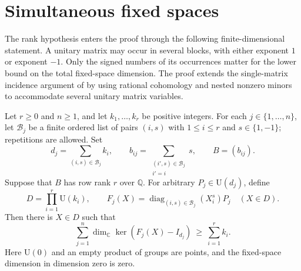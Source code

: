 \section{Simultaneous fixed spaces}\label{sec:fixed}

The rank hypothesis enters the proof through the following finite-dimensional
statement.  A unitary matrix may occur in several blocks, with either exponent
$1$ or exponent $-1$.  Only the signed numbers of its occurrences matter for
the lower bound on the total fixed-space dimension.
The proof extends the single-matrix incidence argument of
\cite[Lemma~3.1]{OpenAIKervaire2026} by using rational cohomology and
nested nonzero minors to accommodate several unitary matrix variables.

\begin{theorem}\label{thm:fixed-space}
Let $r\geq 0$ and $n\geq 1$, and let $k_1,\ldots,k_r$ be positive integers.
For each $j\in\{1,\ldots,n\}$, let $\mathcal B_j$ be a finite ordered list
of pairs $(i,s)$ with $1\leq i\leq r$ and $s\in\{1,-1\}$; repetitions
are allowed.  Set
\[
 d_j=\sum_{(i,s)\in\mathcal B_j}k_i,
 \qquad
 b_{ij}=\sum_{\substack{(i',s)\in\mathcal B_j\\i'=i}}s,
 \qquad B=(b_{ij}).
\]
Suppose that $B$ has row rank $r$ over $\mathbb Q$.  For arbitrary
$P_j\in\mathrm U(d_j)$, define
\[
 D=\prod_{i=1}^r\mathrm U(k_i),
 \qquad
 F_j(X)=\operatorname{diag}_{(i,s)\in\mathcal B_j}(X_i^s)P_j
 \quad (X\in D).
\]
Then there is $X\in D$ such that
\begin{equation}\label{eq:fixed-space-bound}
 \sum_{j=1}^n\dim_{\mathbb C}\ker(F_j(X)-I_{d_j})
 \ \geq\ \sum_{i=1}^r k_i.
\end{equation}
Here $\mathrm U(0)$ and an empty product of groups are points, and the
fixed-space dimension in dimension zero is zero.
\end{theorem}

